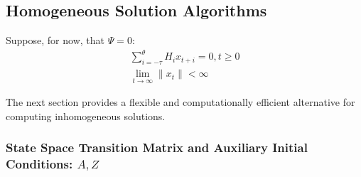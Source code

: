 \documentclass[12pt]{elsart}
\begin{document}




%   







\subsection{Homogeneous Solution Algorithms}
\label{sec:homo}


Suppose, for now, that $\Psi=0$:
\begin{gather}
\sum_{i= - \tau}^\theta{ H_i  x_{ t + i } }= 0, t \geq0\label{eq:homo}\\
\lim_{ t \rightarrow\infty} \|x_t\|   < \infty%
\end{gather}

The next section provides a flexible 
and computationally efficient alternative for 
computing inhomogeneous solutions.








\subsubsection{State Space Transition Matrix and Auxiliary Initial Conditions: $A, Z$}
\label{sec:arzgev}
\end{document}
